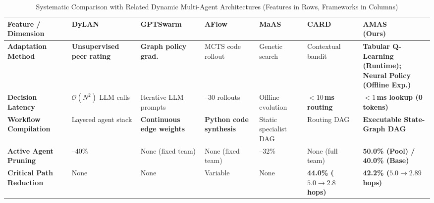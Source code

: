 \begin{table}[!t]
\centering
\caption{Systematic Comparison with Related Dynamic Multi-Agent Architectures (Features in Rows, Frameworks in Columns)}
\label{tab:literature_comparison}
\footnotesize
\setlength{\tabcolsep}{3.0pt}
\renewcommand{\arraystretch}{1.22}
\begin{tabularx}{\textwidth}{>{\raggedright\arraybackslash\bfseries}p{2.85cm} *{5}{>{\raggedright\arraybackslash\hyphenpenalty=10000\hsize=0.86\hsize}X} >{\raggedright\arraybackslash\hyphenpenalty=10000\hsize=1.70\hsize\bfseries}X}
\toprule
\makecell[c]{\textbf{Feature /}\\\textbf{Dimension}} & 
\makecell[c]{\textbf{DyLAN}\\\cite{liu2024dylan}} & 
\makecell[c]{\textbf{GPTSwarm}\\\cite{zhuge2024gptswarm}} & 
\makecell[c]{\textbf{AFlow}\\\cite{zhang2024aflow}} & 
\makecell[c]{\textbf{MaAS}\\\cite{Zhang2025MaAS}} & 
\makecell[c]{\textbf{CARD}\\\cite{Li2025AdaptiveGraphPruning}} & 
\makecell[c]{\textbf{AMAS}\\\textbf{(Ours)}} \\
\midrule
Adaptation Method & 
\textbf{Unsupervised peer rating} & 
\textbf{Graph policy grad.} & 
MCTS code rollout & 
Genetic search & 
Contextual bandit & 
\makecell[l]{\textbf{Tabular Q-Learning (Runtime);}\\\textbf{Neural Policy (Offline Exp.)}} \\

Decision Latency & 
$\mathcal{O}(N^2)$ LLM calls & 
Iterative LLM prompts & 
15--30 rollouts & 
Offline evolution & 
\textbf{$<10$\,ms routing} & 
$<1$\,ms lookup (0 tokens) \\

Workflow Compilation & 
Layered agent stack & 
\textbf{Continuous edge weights} & 
\textbf{Python code synthesis} & 
Static specialist DAG & 
Routing DAG & 
Executable State-Graph DAG \\

Active Agent Pruning & 
25--40\% & 
None (fixed team) & 
None (fixed team) & 
18--32\% & 
None (full team) & 
50.0\% (Pool) / 40.0\% (Base) \\

Critical Path Reduction & 
None & 
None & 
Variable & 
None & 
\textbf{44.0\% ($5.0 \to 2.8$ hops)} & 
42.2\% ($5.0 \to 2.89$ hops) \\


\end{tabularx}
\end{table}

